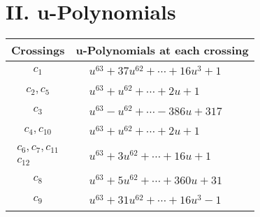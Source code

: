 \documentclass[1p]{elsarticle_modified}
\theoremstyle{definition}
\begin{document}
\newpage\renewcommand{\arraystretch}{1}
\centering \section*{ II. u-Polynomials}
\begin{tabular}{m{50pt}|m{274pt}}
Crossings & \hspace{64pt}u-Polynomials at each crossing \\
\hline $$\begin{aligned}c_{1}\end{aligned}$$&$\begin{aligned}
&u^{63}+37 u^{62}+\cdots+16 u^3+1
\end{aligned}$\\
\hline $$\begin{aligned}c_{2},c_{5}\end{aligned}$$&$\begin{aligned}
&u^{63}+u^{62}+\cdots+2 u+1
\end{aligned}$\\
\hline $$\begin{aligned}c_{3}\end{aligned}$$&$\begin{aligned}
&u^{63}- u^{62}+\cdots-386 u+317
\end{aligned}$\\
\hline $$\begin{aligned}c_{4},c_{10}\end{aligned}$$&$\begin{aligned}
&u^{63}+u^{62}+\cdots+2 u+1
\end{aligned}$\\
\hline $$\begin{aligned}c_{6},c_{7},c_{11}\\c_{12}\end{aligned}$$&$\begin{aligned}
&u^{63}+3 u^{62}+\cdots+16 u+1
\end{aligned}$\\
\hline $$\begin{aligned}c_{8}\end{aligned}$$&$\begin{aligned}
&u^{63}+5 u^{62}+\cdots+360 u+31
\end{aligned}$\\
\hline $$\begin{aligned}c_{9}\end{aligned}$$&$\begin{aligned}
&u^{63}+31 u^{62}+\cdots+16 u^3-1
\end{aligned}$\\
\hline
\end{tabular}\newpage\renewcommand{\arraystretch}{1}
\end{document}
